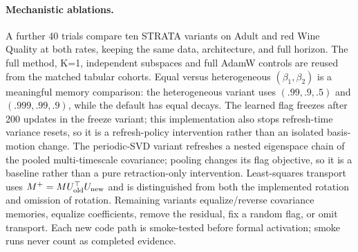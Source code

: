 \paragraph{Mechanistic ablations.}
A further 40 trials compare ten STRATA variants on Adult and red Wine Quality at both rates, keeping the same data, architecture, and full horizon. The full method, K=1, independent subspaces and full AdamW controls are reused from the matched tabular cohorts. Equal versus heterogeneous $(\beta_1,\beta_2)$ is a meaningful memory comparison: the heterogeneous variant uses $(.99,.9,.5)$ and $(.999,.99,.9)$, while the default has equal decays. The learned flag freezes after 200 updates in the freeze variant; this implementation also stops refresh-time variance resets, so it is a refresh-policy intervention rather than an isolated basis-motion change. The periodic-SVD variant refreshes a nested eigenspace chain of the pooled multi-timescale covariance; pooling changes its flag objective, so it is a baseline rather than a pure retraction-only intervention. Least-squares transport uses $M^+=MU_{\rm old}^\top U_{\rm new}$ and is distinguished from both the implemented rotation and omission of rotation. Remaining variants equalize/reverse covariance memories, equalize coefficients, remove the residual, fix a random flag, or omit transport. Each new code path is smoke-tested before formal activation; smoke runs never count as completed evidence.

\FloatBarrier


\FloatBarrier

